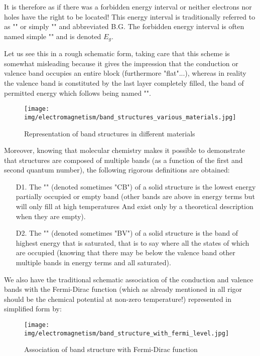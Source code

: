 	It is therefore as if there was a forbidden energy interval or neither electrons nor holes have the right to be located! This energy interval is traditionally referred to as "" or simply "" and abbreviated B.G. The forbidden energy interval is often named simple "" and is denoted $E_g$.

	Let us see this in a rough schematic form, taking care that this scheme is somewhat misleading because it gives the impression that the conduction or valence band occupies an entire block (furthermore "flat"...), whereas in reality the valence band is constituted by the last layer completely filled, the band of permitted energy which follows being named "".
	\begin{figure}[H]
		\centering
		\texttt{[image: img/electromagnetism/band\_structures\_various\_materials.jpg]}
		\caption{Representation of band structures in different materials}
	\end{figure}
	Moreover, knowing that molecular chemistry makes it possible to demonstrate that structures are composed of multiple bands (as a function of the first and second quantum number), the following rigorous definitions are obtained:
	\begin{enumerate}
		\item[D1.] The "" (denoted sometimes "CB") of a solid structure is the lowest energy partially occupied or empty  band (other bands are above in energy terms but will only fill at high temperatures And exist only by a theoretical description when they are empty).

		\item[D2.] The "" (denoted sometimes "BV") of a solid structure is the band of highest energy that is saturated, that is to say where all the states of which are occupied (knowing that there may be below the valence band other multiple bands in energy terms and all saturated).
	\end{enumerate}
	We also have the traditional schematic association of the conduction and valence bands with the Fermi-Dirac function (which as already mentioned in all rigor should be the chemical potential at non-zero temperature!) represented in simplified form by:
	\begin{figure}[H]
		\centering
		\texttt{[image: img/electromagnetism/band\_structure\_with\_fermi\_level.jpg]}
		\caption{Association of band structure with Fermi-Dirac function}
	\end{figure}
